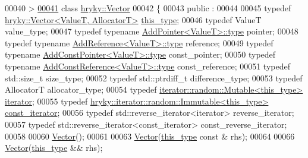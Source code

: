 \begin{DoxyCode}
00040     >
\hypertarget{vector_8h_source_l00041}{}\hyperlink{classhryky_1_1_vector}{00041} \textcolor{keyword}{class }\hyperlink{classhryky_1_1_vector}{hryky::Vector}
00042 \{
00043 \textcolor{keyword}{public} :
00044 
00045     \textcolor{keyword}{typedef} \hyperlink{classhryky_1_1_vector}{hryky::Vector<ValueT, AllocatorT>}               \hyperlink{classhryky_1_1_vector}{this_type};
00046     \textcolor{keyword}{typedef} ValueT                                          value\_type;
00047     \textcolor{keyword}{typedef} \textcolor{keyword}{typename} \hyperlink{classhryky_1_1_add_pointer_a02d0c31ee76f5cb3f0ba3ca4c01fc8d3}{AddPointer<ValueT>::type}               pointer;
00048     \textcolor{keyword}{typedef} \textcolor{keyword}{typename} \hyperlink{classhryky_1_1_add_reference_a4b90c1381625432ba6152b7388bc4399}{AddReference<ValueT>::type}             reference;
00049     \textcolor{keyword}{typedef} \textcolor{keyword}{typename} \hyperlink{classhryky_1_1_add_const_pointer_a62e5c44fefac145f6bd2460e4c8d0ba2}{AddConstPointer<ValueT>::type}          const\_pointer;
00050     \textcolor{keyword}{typedef} \textcolor{keyword}{typename} \hyperlink{classhryky_1_1_add_const_reference_aa26e39e87462673d865c90e6a9798b5a}{AddConstReference<ValueT>::type}        const\_reference;
00051     \textcolor{keyword}{typedef} std::size\_t                                     size\_type;
00052     \textcolor{keyword}{typedef} std::ptrdiff\_t                                  difference\_type;
00053     \textcolor{keyword}{typedef} AllocatorT                                      allocator\_type;
00054     \textcolor{keyword}{typedef} \hyperlink{classhryky_1_1iterator_1_1random_1_1_mutable}{iterator::random::Mutable<this_type>}            \hyperlink{classhryky_1_1iterator_1_1random_1_1_mutable}{iterator};
00055     \textcolor{keyword}{typedef} \hyperlink{classhryky_1_1iterator_1_1random_1_1_immutable}{hryky::iterator::random::Immutable<this_type>}   \hyperlink{classhryky_1_1iterator_1_1random_1_1_immutable}{const_iterator};
00056     \textcolor{keyword}{typedef} std::reverse\_iterator<iterator>                 reverse\_iterator;
00057     \textcolor{keyword}{typedef} std::reverse\_iterator<const\_iterator>           
      const\_reverse\_iterator;
00058 
00060     \hyperlink{classhryky_1_1_vector_abe97d2779dcc79a8d599dbd8ff66451b}{Vector}();
00061 
00063     \hyperlink{classhryky_1_1_vector_abe97d2779dcc79a8d599dbd8ff66451b}{Vector}(\hyperlink{classhryky_1_1_vector}{this_type} \textcolor{keyword}{const} & rhs);
00064 
00066     \hyperlink{classhryky_1_1_vector_abe97d2779dcc79a8d599dbd8ff66451b}{Vector}(\hyperlink{classhryky_1_1_vector}{this_type} && rhs);

\end{DoxyCode}
